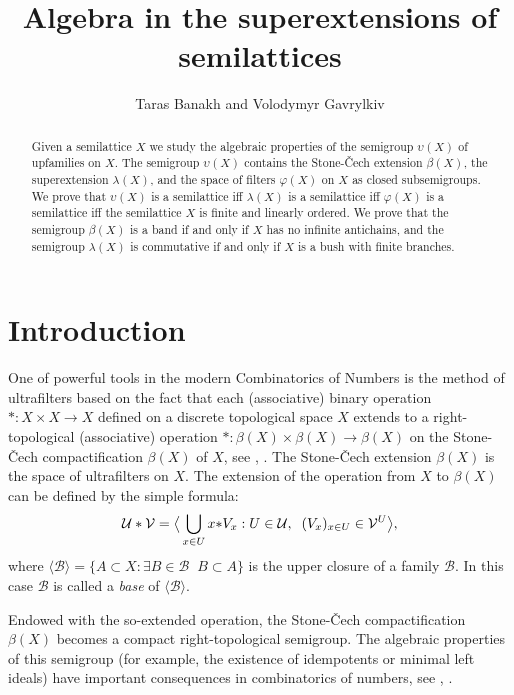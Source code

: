 \documentclass{amsart}
\title{Algebra in the superextensions of semilattices}
\author{Taras Banakh and Volodymyr Gavrylkiv}
\theoremstyle{definition}
\begin{document}
\begin{abstract} Given a semilattice $X$ we study the algebraic properties of the semigroup ${\upsilon}(X)$ of upfamilies on $X$. The semigroup ${\upsilon}(X)$ contains the Stone-\v Cech extension $\beta(X)$, the superextension $\lambda(X)$, and the space of filters $\varphi(X)$ on $X$ as closed subsemigroups. We prove that ${\upsilon}(X)$ is a semilattice iff $\lambda(X)$ is a semilattice iff $\varphi(X)$ is a semilattice iff the semilattice $X$ is  finite and linearly ordered. We prove that the semigroup $\beta(X)$ is a band if and only if $X$ has no infinite antichains, and the semigroup $\lambda(X)$ is commutative if and only if $X$ is a bush with finite branches.
\end{abstract}
\maketitle

\section*{Introduction}

One of powerful tools in the modern Combinatorics of Numbers is
the method of ultrafilters based on the fact that each
(associative) binary operation $*:X\times X\to X$ defined on a
discrete topological space $X$ extends to a
right-topological (associative) operation $*:\beta (X)\times \beta
(X)\to\beta (X)$ on the Stone-\v Cech compactification $\beta (X)$
of $X$, see \cite{HS}, \cite{P}.
 The Stone-\v Cech extension $\beta (X)$ is the space
of ultrafilters on $X$. The extension of the operation from $X$ to
$\beta(X)$ can be defined by the simple formula:
\begin{equation}\label{extension}{\mathcal U}\ast{\mathcal V}=\big{\langle}\bigcup_{x\in U}x{*}V_x:U\in{\mathcal U},\;\;(V_x)_{x\in U}\in {\mathcal V}^U\big{\rangle},
\end{equation}
where ${\langle} \mathcal B{\rangle}=\{A\subset X:\exists B\in\mathcal B\;\;B\subset A\}$ is the upper closure of a family $\mathcal B$. In this case $\mathcal B$ is called a {\em base} of ${\langle}\mathcal B{\rangle}$.

Endowed with the so-extended operation, the Stone-\v Cech
compactification $\beta(X)$ becomes a compact right-topological
semigroup. The algebraic properties of this semigroup (for
example, the existence of idempotents or minimal left ideals) have
important consequences in combinatorics of numbers, see \cite{HS},
\cite{P}.
\end{document}
